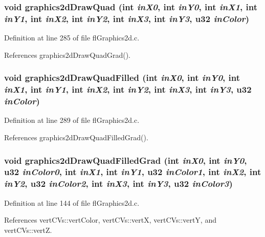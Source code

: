 \subsubsection{\setlength{\rightskip}{0pt plus 5cm}void graphics2d\-Draw\-Quad (int {\em in\-X0}, int {\em in\-Y0}, int {\em in\-X1}, int {\em in\-Y1}, int {\em in\-X2}, int {\em in\-Y2}, int {\em in\-X3}, int {\em in\-Y3}, u32 {\em in\-Color})}\label{flGraphics2d_8c_c1d2e699b20f3d9ae7239f6785f43ba8}




Definition at line 285 of file fl\-Graphics2d.c.

References graphics2d\-Draw\-Quad\-Grad().
\subsubsection{\setlength{\rightskip}{0pt plus 5cm}void graphics2d\-Draw\-Quad\-Filled (int {\em in\-X0}, int {\em in\-Y0}, int {\em in\-X1}, int {\em in\-Y1}, int {\em in\-X2}, int {\em in\-Y2}, int {\em in\-X3}, int {\em in\-Y3}, u32 {\em in\-Color})}\label{flGraphics2d_8c_d3af9c2ef1e8251493b8b15a6bdb7583}




Definition at line 289 of file fl\-Graphics2d.c.

References graphics2d\-Draw\-Quad\-Filled\-Grad().
\subsubsection{\setlength{\rightskip}{0pt plus 5cm}void graphics2d\-Draw\-Quad\-Filled\-Grad (int {\em in\-X0}, int {\em in\-Y0}, u32 {\em in\-Color0}, int {\em in\-X1}, int {\em in\-Y1}, u32 {\em in\-Color1}, int {\em in\-X2}, int {\em in\-Y2}, u32 {\em in\-Color2}, int {\em in\-X3}, int {\em in\-Y3}, u32 {\em in\-Color3})}\label{flGraphics2d_8c_cd1c14a7dd6e330988bc27e99f90dd95}




Definition at line 144 of file fl\-Graphics2d.c.

References vert\-CVs::vert\-Color, vert\-CVs::vert\-X, vert\-CVs::vert\-Y, and vert\-CVs::vert\-Z.

